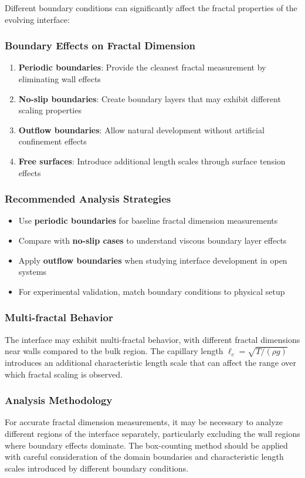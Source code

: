 \documentclass[12pt,a4paper]{article}
\begin{document}
Different boundary conditions can significantly affect the fractal properties of the evolving interface:

\subsubsection{Boundary Effects on Fractal Dimension}
\begin{enumerate}
    \item \textbf{Periodic boundaries}: Provide the cleanest fractal measurement by eliminating wall effects
    \item \textbf{No-slip boundaries}: Create boundary layers that may exhibit different scaling properties
    \item \textbf{Outflow boundaries}: Allow natural development without artificial confinement effects
    \item \textbf{Free surfaces}: Introduce additional length scales through surface tension effects
\end{enumerate}

\subsubsection{Recommended Analysis Strategies}
\begin{itemize}
    \item Use \textbf{periodic boundaries} for baseline fractal dimension measurements
    \item Compare with \textbf{no-slip cases} to understand viscous boundary layer effects
    \item Apply \textbf{outflow boundaries} when studying interface development in open systems
    \item For experimental validation, match boundary conditions to physical setup
\end{itemize}

\subsubsection{Multi-fractal Behavior}
The interface may exhibit multi-fractal behavior, with different fractal dimensions near walls compared to the bulk region. The capillary length $\ell_c = \sqrt{T/(\rho g)}$ introduces an additional characteristic length scale that can affect the range over which fractal scaling is observed.

\subsubsection{Analysis Methodology}
For accurate fractal dimension measurements, it may be necessary to analyze different regions of the interface separately, particularly excluding the wall regions where boundary effects dominate. The box-counting method should be applied with careful consideration of the domain boundaries and characteristic length scales introduced by different boundary conditions.
\end{document}

